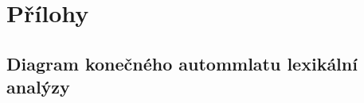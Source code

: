 \documentclass[a4paper, 12pt]{article}
\begin{document}
\newpage
\section{Přílohy} \label{prilohy}

\renewcommand\thesubsection{\thesection.\Alph{subsection}}


\subsection{Diagram konečného autommlatu lexikální analýzy} \label{subsec:automat}
\end{document}
